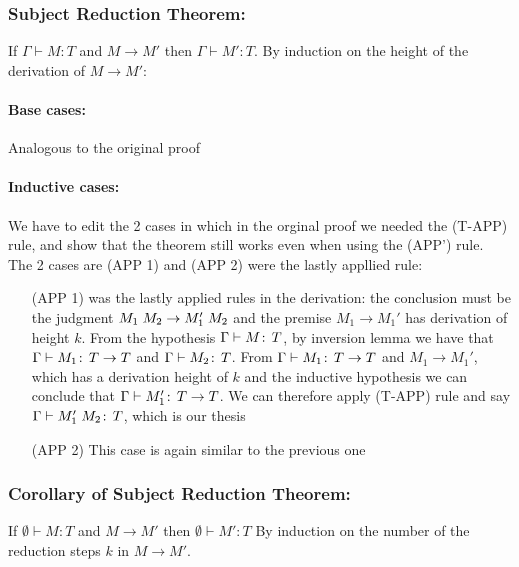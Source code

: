 \subsubsection*{Subject Reduction Theorem:}

If $\Gamma \vdash M: T$ and $M \to M'$ then $\Gamma \vdash M': T$.
By induction on the height of the derivation of $M \to M'$:

\paragraph*{Base cases:\\}

Analogous to the original proof

\paragraph*{Inductive cases:\\}
We have to edit the 2 cases in which in the orginal proof we needed
the (T-APP) rule, and show that the theorem still works even when
using the (APP') rule. The 2 cases are (APP 1) and (APP 2) were the
lastly appllied rule:
\begin{itemize}
\item[(APP 1)] was the lastly applied rules in the derivation: the
  conclusion must be the judgment \(M_1\;M_2 \to
  M_1'\;M_2\) and the premise \(M_1 \to M_1'\) has derivation of
  height \(k\). From the hypothesis \(\Gamma \vdash M \!:\,T\), by
  inversion lemma we have that \(\Gamma \vdash M_1 \!:\,T \to T\)
  and \(\Gamma \vdash M_2 \!:\,T\). From \(\Gamma \vdash M_1 \!:\,T
    \to T\) and \(M_1 \to M_1'\), which has a derivation height of
  \(k\) and the inductive hypothesis we can conclude that \(\Gamma
  \vdash M_1' \!:\,T \to T\). We can therefore apply (T-APP) rule
  and say \(\Gamma \vdash M_1'\;M_2 \!:\,T\), which is our
  thesis
\item[(APP 2)] This case is again similar to the previous one
\end{itemize}


\subsubsection*{Corollary of Subject Reduction Theorem:}

If $\emptyset \vdash M: T$ and $M \to M'$ then $\emptyset \vdash M': T$
By induction on the number of the reduction steps $k$ in $M \to M'$.

